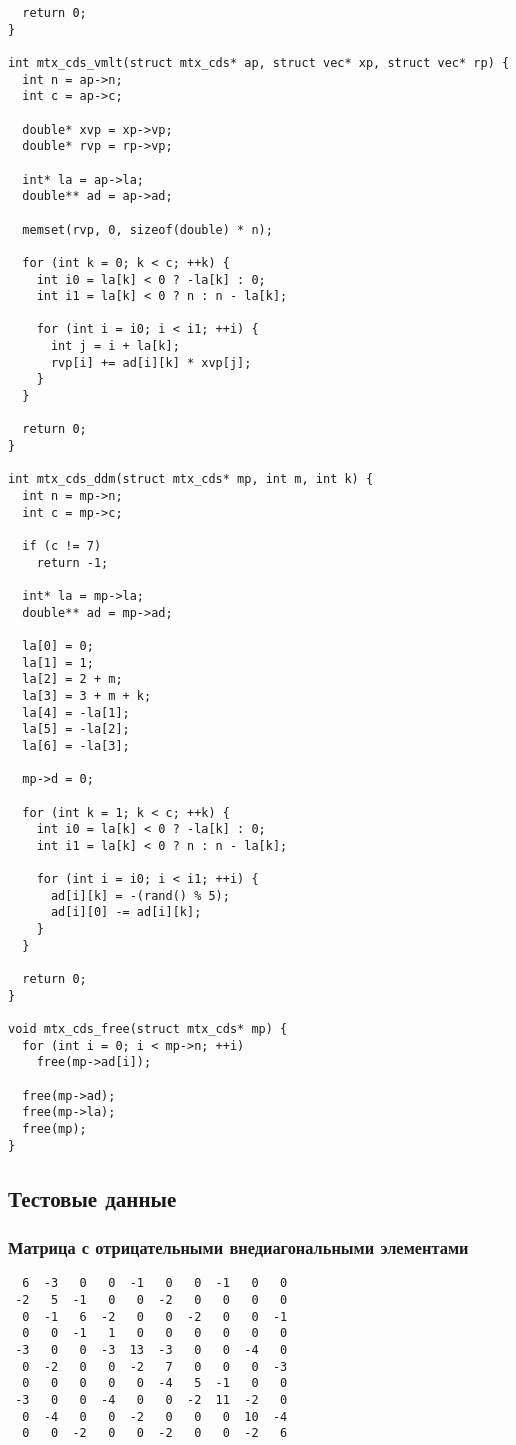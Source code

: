 \documentclass[12pt, a4paper]{article}
\begin{document}
\begin{verbatim}
  return 0;
}

int mtx_cds_vmlt(struct mtx_cds* ap, struct vec* xp, struct vec* rp) {
  int n = ap->n;
  int c = ap->c;

  double* xvp = xp->vp;
  double* rvp = rp->vp;

  int* la = ap->la;
  double** ad = ap->ad;

  memset(rvp, 0, sizeof(double) * n);

  for (int k = 0; k < c; ++k) {
    int i0 = la[k] < 0 ? -la[k] : 0;
    int i1 = la[k] < 0 ? n : n - la[k];

    for (int i = i0; i < i1; ++i) {
      int j = i + la[k];
      rvp[i] += ad[i][k] * xvp[j];
    }
  }

  return 0;
}

int mtx_cds_ddm(struct mtx_cds* mp, int m, int k) {
  int n = mp->n;
  int c = mp->c;

  if (c != 7)
    return -1;

  int* la = mp->la;
  double** ad = mp->ad;

  la[0] = 0;
  la[1] = 1;
  la[2] = 2 + m;
  la[3] = 3 + m + k;
  la[4] = -la[1];
  la[5] = -la[2];
  la[6] = -la[3];

  mp->d = 0;

  for (int k = 1; k < c; ++k) {
    int i0 = la[k] < 0 ? -la[k] : 0;
    int i1 = la[k] < 0 ? n : n - la[k];

    for (int i = i0; i < i1; ++i) {
      ad[i][k] = -(rand() % 5);
      ad[i][0] -= ad[i][k];
    }
  }

  return 0;
}

void mtx_cds_free(struct mtx_cds* mp) {
  for (int i = 0; i < mp->n; ++i)
    free(mp->ad[i]);

  free(mp->ad);
  free(mp->la);
  free(mp);
}
\end{verbatim}

\subsection{Тестовые данные}
\subsubsection{Матрица с отрицательными внедиагональными элементами}
\begin{verbatim}
  6  -3   0   0  -1   0   0  -1   0   0
 -2   5  -1   0   0  -2   0   0   0   0
  0  -1   6  -2   0   0  -2   0   0  -1
  0   0  -1   1   0   0   0   0   0   0
 -3   0   0  -3  13  -3   0   0  -4   0
  0  -2   0   0  -2   7   0   0   0  -3
  0   0   0   0   0  -4   5  -1   0   0
 -3   0   0  -4   0   0  -2  11  -2   0
  0  -4   0   0  -2   0   0   0  10  -4 
  0   0  -2   0   0  -2   0   0  -2   6 
\end{verbatim}
\end{document}
